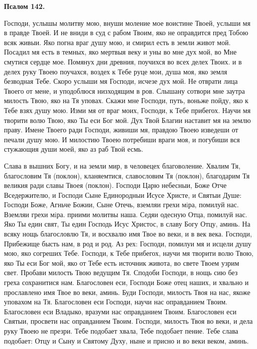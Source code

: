 \medskip


\bfseries Псалом 142.\normalfont{}


Господи, услышы молитву мою, внуши моление мое воистине Твоей, услыши мя в правде Твоей. И не вниди в суд с рабом Твоим, яко не оправдится пред Тобою всяк живыи. Яко погна враг душу мою, и смирил есть в земли живот мой. Посадил мя есть в темных, яко мертвыя веку и уны во мне дух мой, во Мне смутися сердце мое. Помянух дни древния, поучихся во всех делех Твоих. и в делех руку Твоею поучахся, воздех к Тебе руце мои, душа моя, яко земля безводная Тебе. Скоро услыши мя Господи, исчезе дух мой. Не отврати лица Твоего от мене, и уподоблюся низходящим в ров. Слышану сотвори мне заутра милость Твою, яко на Тя уповах. Скажи мне Господи, путь, воньже пойду, яко к Тебе взях душу мою. Изми мя от враг моих, Господи, к Тебе прибегох. Научи мя творити волю Твою, яко Ты еси Бог мой. Дух Твой Благии наставит мя на землю праву. Имене Твоего ради Господи, живиши мя, правдою Твоею изведеши от печали душу мою. И милостию Твоею потребиши враги моя, и погубиши вся стужающия души моей, яко аз раб Твой есмь.


Слава в вышних Богу, и на земли мир, в человецех благоволение. Хвалим Тя, благословим Тя (поклон), кланяемтися, славословим Тя (поклон), благодарим Тя великия ради славы Твоея (поклон). Господи Царю небесныи, Боже Отче Вседержителю, и Господи Сыне Единородныи Исусе Христе, и Святыи Душе: Господи Боже, Агньче Божии, Сыне Отечь, вземляи грехи мiра, помилуй нас. Вземляи грехи мiра. приими молитвы наша. Седяи одесную Отца, помилуй нас. Яко Ты един свят, Ты един Господь Исус Христос, в славу Богу Отцу, аминь. На всяку нощь благословлю Тя, и восхвалю имя Твое во веки, и в век века. Господи, Прибежище бысть нам, в род и род. Аз рех: Господи, помилуи мя и исцели душу мою, яко согреших Тебе. Господи, к Тебе прибегох, научи мя творити волю Твою, яко Ты еси Бог мой, яко от Тебе есть источник живота, во свете Твоем узрим свет. Пробави милость Твою ведущим Тя. Сподоби Господи, в нощь сию без греха сохранитися нам. Благословен еси, Господи Боже отец наших, и хвально и прославлено имя Твое во веки,  аминь. Буди Господи, милость Твоя на нас, якоже уповахом на Тя. Благословен еси Господи, научи нас оправданием Твоим. Благословен еси Владыко, вразуми нас оправданием Твоим. Благословен еси Святыи, просвети нас оправданием Твоим. Господи, милость Твоя во веки, и дела руку Твоею не презри. Тебе подобает хвала, Тебе подобает пение. Тебе слава подобает: Отцу и Сыну и Святому Духу, ныне и присно и во веки веком, аминь.

